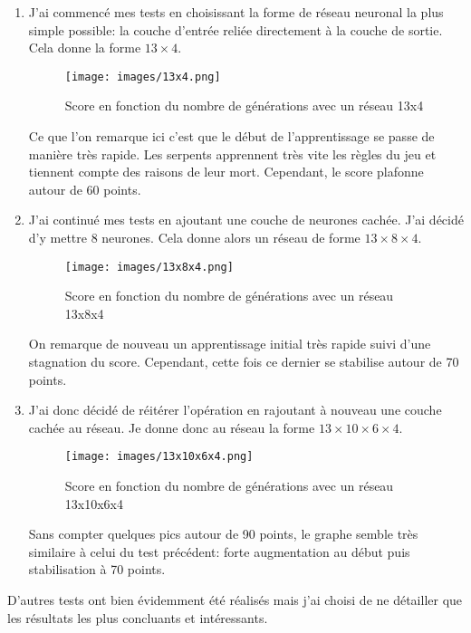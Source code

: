 \documentclass[12pt, a4paper, openany]{book}
\begin{document}
\begin{enumerate}
	\item J'ai commencé mes tests en choisissant la forme de réseau neuronal la plus simple possible: la couche d'entrée reliée directement à la couche de sortie. Cela donne la forme $13\times4$.
	\begin{figure}[H]
    \centering
    \texttt{[image: images/13x4.png]}
    \caption{Score en fonction du nombre de générations avec un réseau 13x4}
	\end{figure}
	Ce que l'on remarque ici c'est que le début de l’apprentissage se passe de manière très rapide. Les serpents apprennent très vite les règles du jeu et tiennent compte des raisons de leur mort. Cependant, le score plafonne autour de 60 points.\newline\newline\newline

	\item J'ai continué mes tests en ajoutant une couche de neurones \og{}cachée\fg{}. J'ai décidé d'y mettre 8 neurones. Cela donne alors un réseau de forme $13\times8\times4$.\newline\newline
	\begin{figure}[H]
    \centering
    \texttt{[image: images/13x8x4.png]}
    \caption{Score en fonction du nombre de générations avec un réseau 13x8x4}
	\end{figure}
	On remarque de nouveau un apprentissage initial très rapide suivi d'une stagnation du score. Cependant, cette fois ce dernier se stabilise autour de 70 points.\newline\newline\newline

	\item J'ai donc décidé de réitérer l'opération en rajoutant à nouveau une couche \og{}cachée\fg{} au réseau. Je donne donc au réseau la forme $13\times10\times6\times4$.
	\begin{figure}[H]
    \centering
    \texttt{[image: images/13x10x6x4.png]}
    \caption{Score en fonction du nombre de générations avec un réseau 13x10x6x4}
	\end{figure}
	Sans compter quelques pics autour de 90 points, le graphe semble très similaire à celui du test précédent: forte augmentation au début puis stabilisation à 70 points.
\end{enumerate}
\begin{center}
D'autres tests ont bien évidemment été réalisés mais j'ai choisi de ne détailler que les résultats les plus concluants et intéressants.
\end{center}
\end{document}
